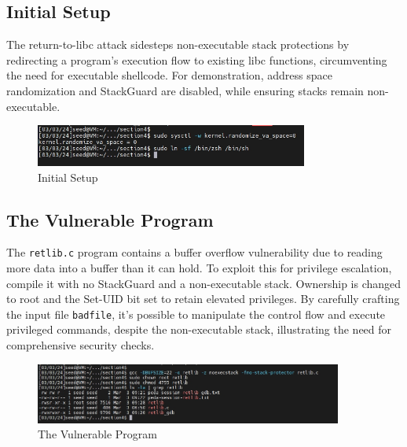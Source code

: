 \documentclass[a4paper,11pt]{article}
\begin{document}
\subsection{Initial Setup}
The return-to-libc attack sidesteps non-executable stack protections by redirecting a program's execution flow to existing libc functions, circumventing the need for executable shellcode. For demonstration, address space randomization and StackGuard are disabled, while ensuring stacks remain non-executable.
\begin{figure}[h]
    \centering
       \includegraphics[width=0.8\textwidth]{figures/task15/task15.png}
    \caption{Initial Setup}\label{fig:task15}
\end{figure}


\subsection{The Vulnerable Program}
The \verb|retlib.c| program contains a buffer overflow vulnerability due to reading more data into a buffer than it can hold. To exploit this for privilege escalation, compile it with no StackGuard and a non-executable stack. Ownership is changed to root and the Set-UID bit set to retain elevated privileges. By carefully crafting the input file \verb|badfile|, it's possible to manipulate the control flow and execute privileged commands, despite the non-executable stack, illustrating the need for comprehensive security checks.
\begin{figure}[h]
    \centering
       \includegraphics[width=0.9\textwidth]{figures/task16/task16.png}
    \caption{The Vulnerable Program}\label{fig:task16}
\end{figure}
\end{document}
